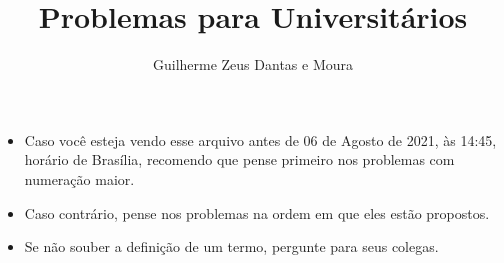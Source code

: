 \documentclass[10pt,a4paper]{article}
\title{Problemas para Universitários}
\author{Guilherme Zeus Dantas e Moura}
\begin{document}
	
	\zeustitle

	\begin{itemize}
		\item Caso você esteja vendo esse arquivo antes de 06 de Agosto de 2021, às 14:45, horário de Brasília, recomendo que pense primeiro nos problemas com numeração maior.

		\item Caso contrário, pense nos problemas na ordem em que eles estão propostos.

		\item Se não souber a definição de um termo, pergunte para seus colegas.
	\end{itemize}

\end{document}
